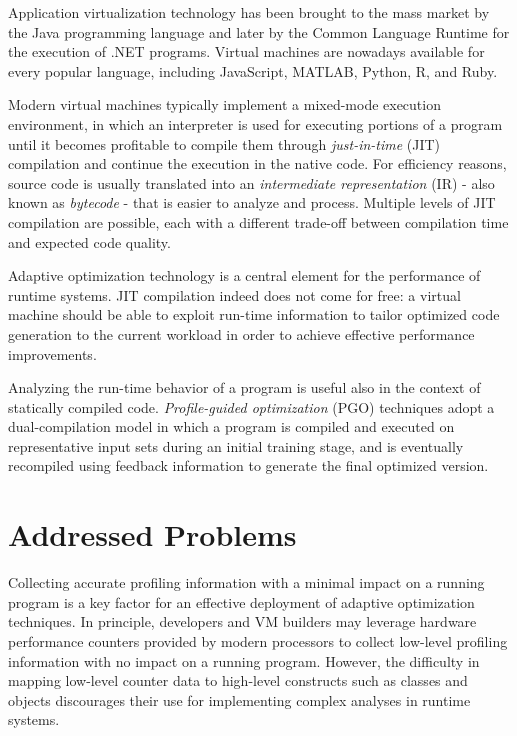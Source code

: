 Application virtualization technology has been brought to the mass market by the Java programming language and later by the Common Language Runtime for the execution of .NET programs. Virtual machines are nowadays available for every popular language, including JavaScript, MATLAB, Python, R, and Ruby.

Modern virtual machines typically implement a mixed-mode execution environment, in which an interpreter is used for executing portions of a program until it becomes profitable to compile them through {\em just-in-time} (JIT) compilation and continue the execution in the native code. For efficiency reasons, source code is usually translated into an {\em intermediate representation} (IR) - also known as {\em bytecode} - that is easier to analyze and process. Multiple levels of JIT compilation are possible, each with a different trade-off between compilation time and expected code quality.

Adaptive optimization technology is a central element for the performance of runtime systems. JIT compilation indeed does not come for free: a virtual machine should be able to exploit run-time information to tailor optimized code generation to the current workload in order to achieve effective performance improvements. 

Analyzing the run-time behavior of a program is useful also in the context of statically compiled code. {\em Profile-guided optimization} (PGO) techniques adopt a dual-compilation model in which a program is compiled and executed on representative input sets during an initial training stage, and is eventually recompiled using feedback information to generate the final optimized version.




\section{Addressed Problems}

Collecting accurate profiling information with a minimal impact on a running program is a key factor for an effective deployment of adaptive optimization techniques. In principle, developers and VM builders may leverage hardware performance counters provided by modern processors to collect low-level profiling information with no impact on a running program. However, the difficulty in mapping low-level counter data to high-level constructs such as classes and objects discourages their use for implementing complex analyses in runtime systems.

